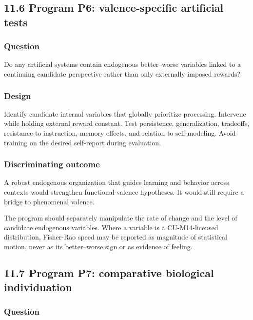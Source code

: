 \documentclass[
  11pt,
]{article}
\begin{document}
\subsection{11.6 Program P6: valence-specific artificial
tests}\label{program-p6-valence-specific-artificial-tests}

\subsubsection{Question}\label{question-5}

Do any artificial systems contain endogenous better--worse variables
linked to a continuing candidate perspective rather than only externally
imposed rewards?

\subsubsection{Design}\label{design-5}

Identify candidate internal variables that globally prioritize
processing. Intervene while holding external reward constant. Test
persistence, generalization, tradeoffs, resistance to instruction,
memory effects, and relation to self-modeling. Avoid training on the
desired self-report during evaluation.

\subsubsection{Discriminating outcome}\label{discriminating-outcome-5}

A robust endogenous organization that guides learning and behavior
across contexts would strengthen functional-valence hypotheses. It would
still require a bridge to phenomenal valence.

The program should separately manipulate the rate of change and the
level of candidate endogenous variables. Where a variable is a
CU-M14-licensed distribution, Fisher-Rao speed may be reported as
magnitude of statistical motion, never as its better--worse sign or as
evidence of feeling.

\subsection{11.7 Program P7: comparative biological
individuation}\label{program-p7-comparative-biological-individuation}

\subsubsection{Question}\label{question-6}
\end{document}
